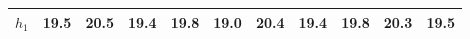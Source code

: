 
        \begin{tabular}{c|*{10}{c}}
            \hline
            \hline
                \(h_{1}\) & 19.5 & 20.5 & 19.4 & 19.8 & 19.0 & 20.4 & 19.4 & 19.8 & 20.3 & 19.5 \\
            \hline
            
            \hline
            \hline
        \end{tabular}
        